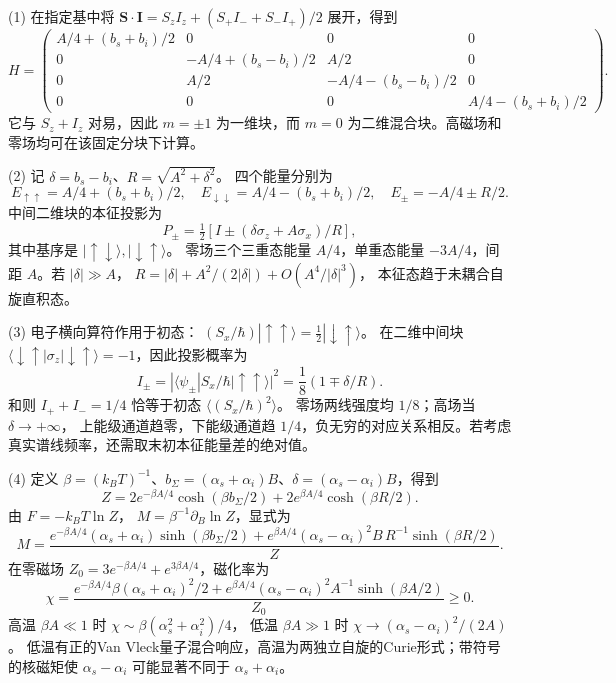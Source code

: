 (1) 在指定基中将
\(\mathbf S\cdot\mathbf I=S_zI_z+(S_+I_-+S_-I_+)/2\) 展开，得到
\[
H=\begin{pmatrix}
A/4+(b_s+b_i)/2&0&0&0\\
0&-A/4+(b_s-b_i)/2&A/2&0\\
0&A/2&-A/4-(b_s-b_i)/2&0\\
0&0&0&A/4-(b_s+b_i)/2
\end{pmatrix}.
\]
它与 \(S_z+I_z\) 对易，因此 \(m=\pm1\) 为一维块，而
\(m=0\) 为二维混合块。高磁场和零场均可在该固定分块下计算。

(2) 记 \(\delta=b_s-b_i\)、\(R=\sqrt{A^2+\delta^2}\)。
四个能量分别为
\[
E_{\uparrow\uparrow}=A/4+(b_s+b_i)/2,\quad
E_{\downarrow\downarrow}=A/4-(b_s+b_i)/2,\quad
E_\pm=-A/4\pm R/2.
\]
中间二维块的本征投影为
\[
P_\pm=\tfrac12[I\pm(\delta\sigma_z+A\sigma_x)/R],
\]
其中基序是 \(|\uparrow\downarrow\rangle,|\downarrow\uparrow\rangle\)。
零场三个三重态能量 \(A/4\)，单重态能量 \(-3A/4\)，间距
\(A\)。若 \(|\delta|\gg A\)，
\(R=|\delta|+A^2/(2|\delta|)+O(A^4/|\delta|^3)\)，
本征态趋于未耦合自旋直积态。

(3) 电子横向算符作用于初态：
\((S_x/\hbar)|\uparrow\uparrow\rangle
=\tfrac12|\downarrow\uparrow\rangle\)。
在二维中间块
\(\langle\downarrow\uparrow|\sigma_z|\downarrow\uparrow\rangle=-1\)，因此投影概率为
\[
I_\pm=|\langle\psi_\pm|S_x/\hbar|\uparrow\uparrow\rangle|^2
=\frac18(1\mp\delta/R).
\]
和则 \(I_++I_-=1/4\) 恰等于初态
\(\langle(S_x/\hbar)^2\rangle\)。
零场两线强度均 \(1/8\)；高场当 \(\delta\to+\infty\)，
上能级通道趋零，下能级通道趋 \(1/4\)，负无穷的对应关系相反。若考虑真实谱线频率，还需取末初本征能量差的绝对值。

(4) 定义 \(\beta=(k_BT)^{-1}\)、\(b_\Sigma=(\alpha_s+\alpha_i)B\)、\(\delta=(\alpha_s-\alpha_i)B\)，得到
\[
Z=2e^{-\beta A/4}\cosh(\beta b_\Sigma/2)
+2e^{\beta A/4}\cosh(\beta R/2).
\]
由 \(F=-k_BT\ln Z\)，
\(M=\beta^{-1}\partial_B\ln Z\)，显式为
\[
M=\frac{
e^{-\beta A/4}(\alpha_s+\alpha_i)\sinh(\beta b_\Sigma/2)
+e^{\beta A/4}(\alpha_s-\alpha_i)^2B\,R^{-1}\sinh(\beta R/2)
}{Z}.
\]
在零磁场 \(Z_0=3e^{-\beta A/4}+e^{3\beta A/4}\)，磁化率为
\[
\chi=\frac{
e^{-\beta A/4}\beta(\alpha_s+\alpha_i)^2/2
+e^{\beta A/4}(\alpha_s-\alpha_i)^2 A^{-1}\sinh(\beta A/2)
}{Z_0}\ge0.
\]
高温 \(\beta A\ll1\) 时
\(\chi\sim\beta(\alpha_s^2+\alpha_i^2)/4\)，
低温 \(\beta A\gg1\) 时
\(\chi\to(\alpha_s-\alpha_i)^2/(2A)\)。
低温有正的Van Vleck量子混合响应，高温为两独立自旋的Curie形式；带符号的核磁矩使
\(\alpha_s-\alpha_i\) 可能显著不同于 \(\alpha_s+\alpha_i\)。

